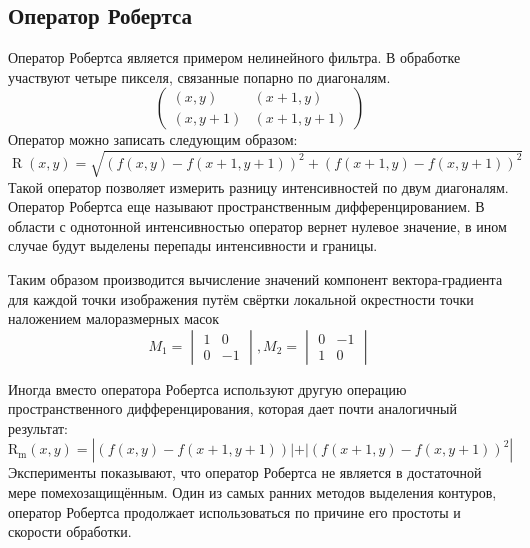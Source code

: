 \documentclass[a4paper,12pt]{report}
\begin{document}
\subsection{Оператор Робертса}
Оператор Робертса является примером нелинейного фильтра. В обработке участвуют 
четыре пикселя, связанные попарно по диагоналям.
\begin{equation}
\begin{pmatrix}
(x,y) & (x+1,y)\\
(x,y+1) & (x+1,y+1)
\end{pmatrix}
\end{equation}
Оператор можно записать следующим образом:
\begin{equation}
\operatorname{R}(x,y)=\sqrt{(f(x,y)-f(x+1,y+1))^2+(f(x+1,y)-f(x,y+1))^2}
\end{equation}
Такой оператор позволяет измерить разницу интенсивностей по двум диагоналям. Оператор Робертса еще называют пространственным дифференцированием. В области с однотонной интенсивностью оператор вернет нулевое значение, в ином случае будут выделены перепады интенсивности и границы. 

Таким образом производится вычисление значений компонент вектора-градиента для каждой точки изображения путём свёртки локальной окрестности точки наложением малоразмерных масок
\begin{equation}
M_1=\begin{vmatrix}1 & 0 \\
0 & -1\end{vmatrix}, M_2=\begin{vmatrix}0 & -1 \\
1 & 0\end{vmatrix}
\end{equation}

Иногда вместо оператора Робертса используют другую операцию 
пространственного дифференцирования,  которая дает почти аналогичный результат:
\begin{equation}
\operatorname{R_m}(x,y)=|{(f(x,y)-f(x+1,y+1))|+|(f(x+1,y)-f(x,y+1))^2}|
\end{equation}
Эксперименты показывают, что оператор Робертса не является в достаточной мере помехозащищённым. Один из самых ранних методов выделения контуров, оператор Робертса продолжает использоваться по причине его простоты и скорости обработки.
\end{document}
